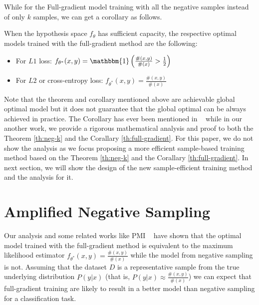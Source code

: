  While for the Full-gradient model training with all the negative samples instead of only $k$ samples, we can get a  corollary  as follows.
 \begin{corollary}\label{th:full-gradient}
 	When the hypothesis space $f_{\theta}$ has sufficient capacity,
 	the respective optimal models trained 
 	with the full-gradient method are the following:
 	\small
 	\begin{itemize}
 		\setlength\itemsep{-0.2em}
 		\item For $L1$ loss: $f_{\theta^*}(x,y) = \mathbbm{1}\left(\frac{\#(x,y)}{\#(x)}> \frac{1}{2}\right)$
 		\item For $L2$ or cross-entropy loss:  $f_{\theta^*}(x,y) = \frac{\#(x,y)}{\#(x)}$
 	\end{itemize}
 	\normalsize
 \end{corollary}

Note that the theorem and corollary mentioned above are achievable global optimal model but it does not guarantee that the global optimal can be always achieved in practice. The Corollary has ever been mentioned in ~\citep{levy2014neural} while in our another work, we provide a rigorous mathematical analysis and proof to both the Theorem \ref{th:neg-k} and the Corallary \ref{th:full-gradient}. For this paper, we do not show the analysis as we focus proposing a more efficient sample-based training method based on the Theorem \ref{th:neg-k} and the Corallary \ref{th:full-gradient}. In next section, we will show the design of the new sample-efficient training method and the analysis for it. 
 
\section{Amplified Negative Sampling}
\label{sec:NS:amplified}
Our analysis  and some related works like PMI ~\citep{levy2014neural} have shown that the optimal model 
trained with the full-gradient method is equivalent to 
the maximum likelihood estimator $f_{\theta^*}(x, y) = \frac{\#(x,y)}{\#(x)}$
while the model from negative sampling is not.
Assuming that the dataset $D$ is a representative sample from the true underlying distribution $P(y|x)$ (that is, $P(y|x) \approx \frac{\#(x,y)}{\#(x)}$) we can expect that full-gradient training are likely to result in a better model than negative sampling for a classification task.

